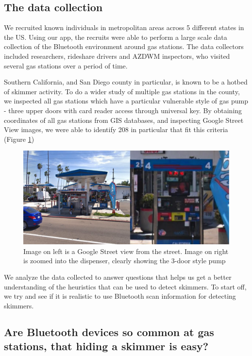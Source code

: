 \subsection{The data collection} %

We recruited known individuals in metropolitan areas across 5 different states in the US. Using our app, the recruits were able to perform a large scale data collection of the Bluetooth environment around gas stations. The data collectors included researchers, rideshare drivers and AZDWM inspectors, who visited several gas stations over a period of time.

Southern California, and San Diego county in particular, is known to be a hotbed of skimmer activity. To do a wider study of multiple gas stations in the county, we inspected all gas stations which have a particular vulnerable style of gas pump - three upper doors with card reader access through universal key. By obtaining coordinates of all gas stations from GIS databases, and inspecting Google Street View images, we were able to identify 208 in particular that fit this criteria (Figure \ref{fig:google_streetview}) 

\begin{figure}
\centering
\includegraphics[width=\linewidth]{fig/googlestreetview.pdf}
\caption{
  \label{fig:google_streetview}
  Image on left is a Google Street view from the street. Image on right is zoomed into the dispenser, clearly showing the 3-door style pump
}
\end{figure}

We analyze the data collected to answer questions that helps us get a better understanding of the heuristics that can be used to detect skimmers. To start off, we try and see if it is realistic to use Bluetooth scan information for detecting skimmers.

\subsection {Are Bluetooth devices so common at gas stations, that hiding a skimmer is easy?}

